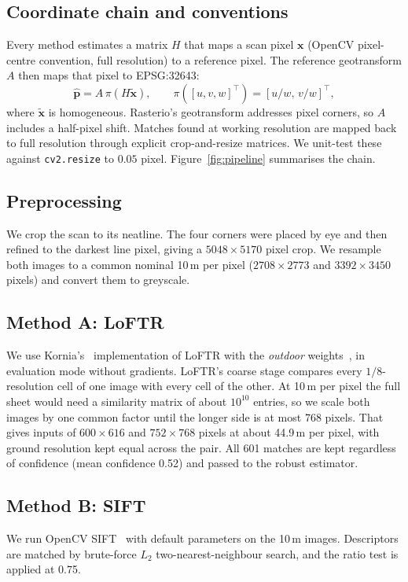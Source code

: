 \documentclass[10pt,twocolumn]{article}
\newcommand{\metre}{\,m}
\begin{document}
\subsection{Coordinate chain and conventions}
Every method estimates a matrix $H$ that maps a scan pixel $\mathbf{x}$ (OpenCV pixel-centre convention, full resolution) to a reference pixel. The reference geotransform $A$ then maps that pixel to EPSG:32643:
\begin{equation}
\hat{\mathbf{p}} = A\,\pi(H\tilde{\mathbf{x}}),\qquad \pi([u,v,w]^\top)=[u/w,\,v/w]^\top,
\end{equation}
where $\tilde{\mathbf{x}}$ is homogeneous. Rasterio's geotransform addresses pixel corners, so $A$ includes a half-pixel shift. Matches found at working resolution are mapped back to full resolution through explicit crop-and-resize matrices. We unit-test these against \texttt{cv2.resize} to $0.05$ pixel. Figure~\ref{fig:pipeline} summarises the chain.

\subsection{Preprocessing}
We crop the scan to its neatline. The four corners were placed by eye and then refined to the darkest line pixel, giving a $5048\times5170$ pixel crop. We resample both images to a common nominal 10\metre{} per pixel ($2708\times2773$ and $3392\times3450$ pixels) and convert them to greyscale.

\subsection{Method A: LoFTR}
We use Kornia's~\citep{riba2020kornia} implementation of LoFTR with the \emph{outdoor} weights~\citep{sun2021loftr}, in evaluation mode without gradients. LoFTR's coarse stage compares every $1/8$-resolution cell of one image with every cell of the other. At 10\metre{} per pixel the full sheet would need a similarity matrix of about $10^{10}$ entries, so we scale both images by one common factor until the longer side is at most 768 pixels. That gives inputs of $600\times616$ and $752\times768$ pixels at about 44.9\metre{} per pixel, with ground resolution kept equal across the pair. All 601 matches are kept regardless of confidence (mean confidence 0.52) and passed to the robust estimator.

\subsection{Method B: SIFT}
We run OpenCV SIFT~\citep{lowe2004sift} with default parameters on the 10\metre{} images. Descriptors are matched by brute-force $L_2$ two-nearest-neighbour search, and the ratio test is applied at 0.75.
\end{document}
